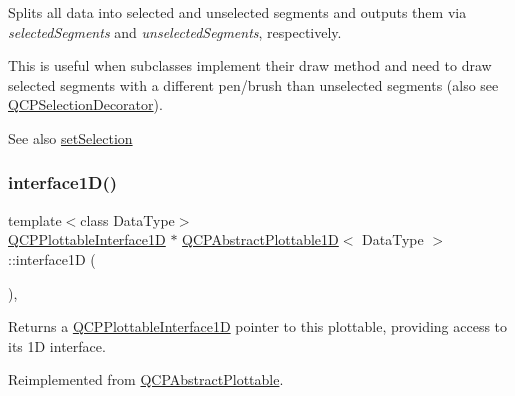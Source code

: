 Splits all data into selected and unselected segments and outputs them via {\itshape selected\+Segments} and {\itshape unselected\+Segments}, respectively.

This is useful when subclasses implement their draw method and need to draw selected segments with a different pen/brush than unselected segments (also see \hyperlink{class_q_c_p_selection_decorator}{Q\+C\+P\+Selection\+Decorator}).

\begin{DoxySeeAlso}{See also}
\hyperlink{class_q_c_p_abstract_plottable_a219bc5403a9d85d3129165ec3f5ae436}{set\+Selection} 
\end{DoxySeeAlso}
\mbox{\label{class_q_c_p_abstract_plottable1_d_a3ab7511c279af967955369606c584dd6}} 
\subsubsection{\texorpdfstring{interface1\+D()}{interface1D()}}
{\footnotesize\ttfamily template$<$class Data\+Type$>$ \\
\hyperlink{class_q_c_p_plottable_interface1_d}{Q\+C\+P\+Plottable\+Interface1D} $\ast$ \hyperlink{class_q_c_p_abstract_plottable1_d}{Q\+C\+P\+Abstract\+Plottable1D}$<$ Data\+Type $>$\+::interface1D (\begin{DoxyParamCaption}{ }\end{DoxyParamCaption})\hspace{0.3cm}{\ttfamily [inline]}, {\ttfamily [virtual]}}

Returns a \hyperlink{class_q_c_p_plottable_interface1_d}{Q\+C\+P\+Plottable\+Interface1D} pointer to this plottable, providing access to its 1D interface.

Reimplemented from \hyperlink{class_q_c_p_abstract_plottable_a81fd9fd5c4f429c074785e2eb238a8e7}{Q\+C\+P\+Abstract\+Plottable}.

\mbox{\label{class_q_c_p_abstract_plottable1_d_a071e2df66ba1746067dfcb5e27947b43}} 
